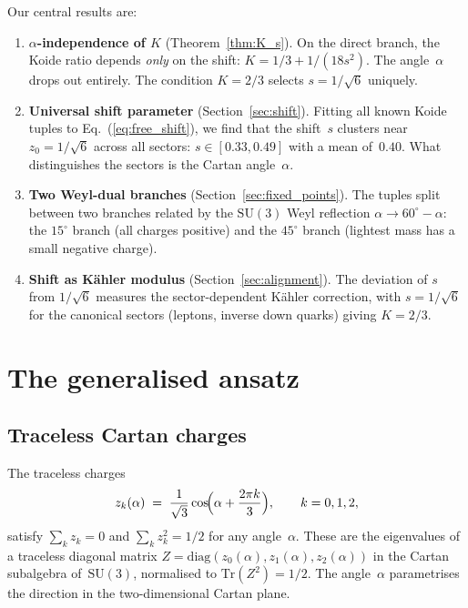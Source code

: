 \documentclass[preprint,12pt]{elsarticle}
\newcommand{\SU}{\mathrm{SU}}
\newcommand{\Tr}{\mathrm{Tr}}
\newcommand{\diag}{\mathrm{diag}}
\begin{document}
Our central results are:

\begin{enumerate}
\item \textbf{$\alpha$-independence of $K$} (Theorem~\ref{thm:K_s}).
  On the direct branch, the Koide ratio depends
  \emph{only} on the shift:
  $K = 1/3 + 1/(18s^2)$.  The angle~$\alpha$ drops out entirely.
  The condition $K = 2/3$ selects $s = 1/\sqrt{6}$ uniquely.

\item \textbf{Universal shift parameter} (Section~\ref{sec:shift}).
  Fitting all known Koide tuples to
  Eq.~(\ref{eq:free_shift}), we find that the shift~$s$
  clusters near $z_0 = 1/\sqrt{6}$ across all sectors:
  $s \in [0.33, 0.49]$ with a mean of~$0.40$.
  What distinguishes the sectors is the Cartan angle~$\alpha$.

\item \textbf{Two Weyl-dual branches} (Section~\ref{sec:fixed_points}).
  The tuples split between two branches related by the
  $\SU(3)$ Weyl reflection $\alpha \to 60^\circ - \alpha$:
  the $15^\circ$ branch (all charges positive) and the
  $45^\circ$ branch (lightest mass has a small negative charge).

\item \textbf{Shift as K\"ahler modulus} (Section~\ref{sec:alignment}).
  The deviation of $s$ from $1/\sqrt{6}$ measures the
  sector-dependent K\"ahler correction, with
  $s = 1/\sqrt{6}$ for the canonical sectors (leptons,
  inverse down quarks) giving $K = 2/3$.
\end{enumerate}

\section{The generalised ansatz}
\label{sec:ansatz}

\subsection{Traceless Cartan charges}

The traceless charges
\begin{equation}
  z_k(\alpha) \;=\; \frac{1}{\sqrt{3}}
  \cos\!\Bigl(\alpha + \frac{2\pi k}{3}\Bigr),
  \qquad k = 0, 1, 2,
  \label{eq:z_def}
\end{equation}
satisfy $\sum_k z_k = 0$ and $\sum_k z_k^2 = 1/2$
for any angle~$\alpha$.  These are the eigenvalues of
a traceless diagonal matrix
$Z = \diag(z_0(\alpha), z_1(\alpha), z_2(\alpha))$
in the Cartan subalgebra of~$\SU(3)$, normalised to
$\Tr(Z^2) = 1/2$.  The angle~$\alpha$ parametrises the
direction in the two-dimensional Cartan plane.
\end{document}
